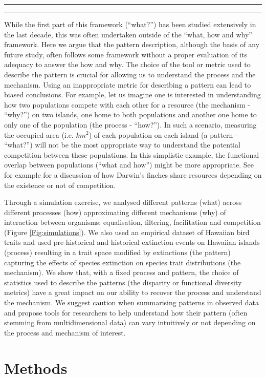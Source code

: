 \documentclass[12pt,letterpaper]{article}
\begin{document}
\bigskip
\hrule
\hrule
\bigskip

While the first part of this framework (``what?'') has been studied extensively in the last decade, this was often undertaken outside of the ``what, how and why'' framework.
Here we argue that the pattern description, although the basis of any future study, often follows some framework without a proper evaluation of its adequacy to answer the how and why.
The choice of the tool or metric used to describe the pattern is crucial for allowing us to understand the process and the mechanism.
Using an inappropriate metric for describing a pattern can lead to biased conclusions.
For example, let us imagine one is interested in understanding how two populations compete with each other for a resource (the mechanism - ``why?'') on two islands, one home to both populations and another one home to only one of the population (the process - ``how?''). In such a scenario, measuring the occupied area (i.e. $km^{2}$) of each population on each island (a pattern - ``what?'') will not be the most appropriate way to understand the potential competition between these populations.
In this simplistic example, the functional overlap between populations (``what and how'') might be more appropriate.
See for example \citealt{carvalho2020decomposing} for a discussion of how Darwin's finches share resources depending on the existence or not of competition.

Through a simulation exercise, we analysed different patterns (what) across different processes (how) approximating different mechanisms (why) of interaction between organisms: equalisation, filtering, facilitation and competition (Figure \ref{Fig:simulations}).
We also used an empirical dataset of Hawaiian bird traits and used pre-historical and historical extinction events on Hawaiian islands (process) resulting in a trait space modified by extinctions (the pattern) capturing the effects of species extinction on species trait distributions (the mechanism).
We show that, with a fixed process and pattern, the choice of statistics used to describe the patterns (the disparity or functional diversity metrics) have a great impact on our ability to recover the process and understand the mechanism.
We suggest caution when summarising patterns in observed data and propose tools for researchers to help understand how their pattern (often stemming from multidimensional data) can vary intuitively or not depending on the process and mechanism of interest.

\section{Methods}
\end{document}
